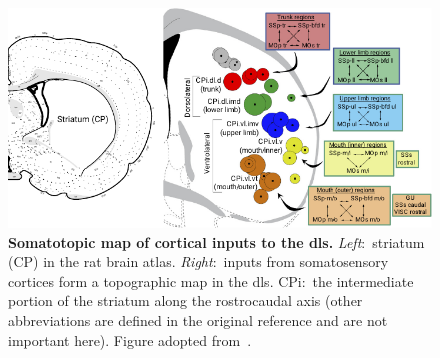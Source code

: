 \begin{figure}[bth!]
	\begin{center}
		\includegraphics[width=1\linewidth]{ch-intro/figures/StriatumInputMap}
		\caption[Map of Cortical Inputs to DLS]
		{\textbf{Somatotopic map of cortical inputs to the \gls{dls}.}
		\textit{Left}:~striatum (CP) in the rat brain atlas.
		\textit{Right}:~inputs from somatosensory cortices form a topographic map in the \gls{dls}.
		CPi:~the intermediate portion of the striatum along the rostrocaudal axis (other abbreviations are defined in the original reference and are not important here).
		Figure adopted from~\cite{Hintiryan2016NN}.
		}
		\label{fig:intro:InputMap}
	\end{center}
\end{figure}